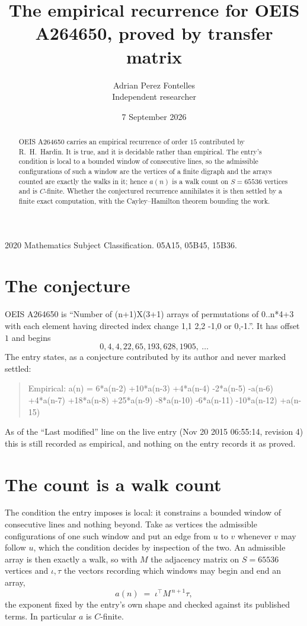 \documentclass[11pt,a4paper]{article}
\title{The empirical recurrence for OEIS A264650, proved by transfer matrix}
\author{Adrian Perez Fontelles\\ \small Independent researcher}
\date{7 September 2026}
\theoremstyle{plain}
\theoremstyle{definition}
\begin{document}
\maketitle

\begin{abstract}
OEIS A264650 carries an empirical recurrence of order $15$ contributed by R.~H.~Hardin. It is
true, and it is decidable rather than empirical. The entry's condition is local to a bounded window of consecutive lines, so
the admissible configurations of such a window are the vertices of a finite digraph and the
arrays counted are exactly the walks in it; hence $a(n)$ is a walk count on $S=65536$ vertices
and is $C$-finite. Whether the conjectured recurrence annihilates it is then settled by a
finite exact computation, with the Cayley--Hamilton theorem bounding the work.
\end{abstract}

\noindent\small 2020 Mathematics Subject Classification. 05A15, 05B45, 15B36.\normalsize

\section{The conjecture}

OEIS A264650 is ``Number of (n+1)X(3+1) arrays of permutations of 0..n*4+3 with each element having directed index change 1,1 2,2 -1,0 or 0,-1.''. It has offset $1$ and begins
\[
0, 4, 4, 22, 65, 193, 628, 1905,\ \dots
\]
The entry states, as a conjecture contributed by its author and never marked settled:
\begin{quote}
Empirical: a(n) = 6*a(n-2) +10*a(n-3) +4*a(n-4) -2*a(n-5) -a(n-6) +4*a(n-7) +18*a(n-8) +25*a(n-9) -8*a(n-10) -6*a(n-11) -10*a(n-12) +a(n-15)
\end{quote}
As of the ``Last modified'' line on the live entry (Nov 20 2015 06:55:14, revision 4) this is still
recorded as empirical, and nothing on the entry records it as proved.

\section{The count is a walk count}

The condition the entry imposes is local: it constrains a bounded window of consecutive lines and nothing beyond. Take as
vertices the admissible configurations of one such window and put an edge from $u$ to $v$
whenever $v$ may follow $u$, which the condition decides by inspection of the two. An
admissible array is then exactly a walk, so with $M$ the adjacency matrix on $S=65536$ vertices
and $\iota,\tau$ the vectors recording which windows may begin and end an array,
\[
a(n)\;=\;\iota^{\!\top}M^{\,n+1}\tau ,
\]
the exponent fixed by the entry's own shape and checked against its published terms. In
particular $a$ is $C$-finite.
\end{document}
